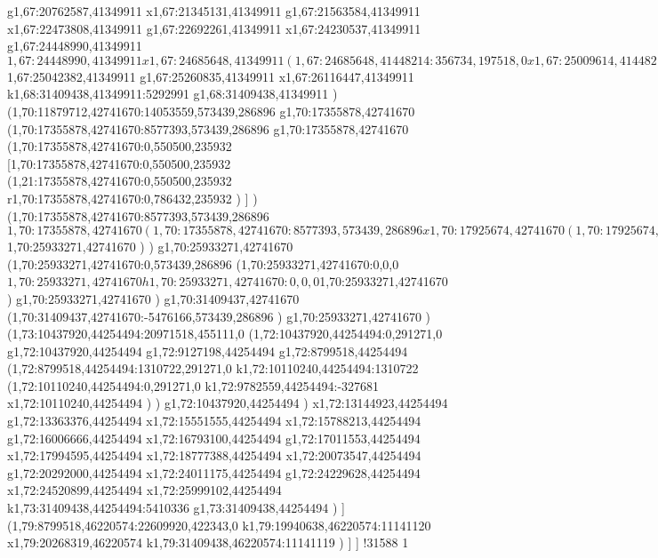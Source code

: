 {g1,67:20762587,41349911
x1,67:21345131,41349911
g1,67:21563584,41349911
x1,67:22473808,41349911
g1,67:22692261,41349911
x1,67:24230537,41349911
g1,67:24448990,41349911
$1,67:24448990,41349911
x1,67:24685648,41349911
(1,67:24685648,41448214:356734,197518,0
x1,67:25009614,41448214
)
$1,67:25042382,41349911
g1,67:25260835,41349911
x1,67:26116447,41349911
k1,68:31409438,41349911:5292991
g1,68:31409438,41349911
)
(1,70:11879712,42741670:14053559,573439,286896
g1,70:17355878,42741670
(1,70:17355878,42741670:8577393,573439,286896
g1,70:17355878,42741670
(1,70:17355878,42741670:0,550500,235932
[1,70:17355878,42741670:0,550500,235932
(1,21:17355878,42741670:0,550500,235932
r1,70:17355878,42741670:0,786432,235932
)
]
)
(1,70:17355878,42741670:8577393,573439,286896
$1,70:17355878,42741670
(1,70:17355878,42741670:8577393,573439,286896
x1,70:17925674,42741670
(1,70:17925674,42471077:497819,197518,0
x1,70:18390725,42471077
)
x1,70:19169877,42741670
g1,70:19351917,42741670
x1,70:20043688,42741670
g1,70:20225728,42741670
x1,70:20795524,42741670
[1,70:20795524,42939365:665910,771134,89201
(1,70:20795524,42450400:665910,282169,65536
x1,70:20993498,42450400
(1,70:20993498,42515936:435168,141084,0
x1,70:21395898,42515936
)
)
(1,70:20795524,42939365:498803,318577,89201
x1,70:21261559,42939365
)
]
x1,70:22207818,42741670
g1,70:22389858,42741670
x1,70:22899584,42741670
g1,70:23081624,42741670
x1,70:24142941,42741670
g1,70:24288573,42741670
x1,70:24798299,42741670
g1,70:24943931,42741670
x1,70:25180589,42741670
(1,70:25180589,42839973:497819,197518,0
x1,70:25645640,42839973
)
x1,70:25933271,42741670
)
$1,70:25933271,42741670
)
)
g1,70:25933271,42741670
(1,70:25933271,42741670:0,573439,286896
(1,70:25933271,42741670:0,0,0
$1,70:25933271,42741670
h1,70:25933271,42741670:0,0,0
$1,70:25933271,42741670
)
g1,70:25933271,42741670
)
g1,70:31409437,42741670
(1,70:31409437,42741670:-5476166,573439,286896
)
g1,70:25933271,42741670
)
(1,73:10437920,44254494:20971518,455111,0
(1,72:10437920,44254494:0,291271,0
g1,72:10437920,44254494
g1,72:9127198,44254494
g1,72:8799518,44254494
(1,72:8799518,44254494:1310722,291271,0
k1,72:10110240,44254494:1310722
(1,72:10110240,44254494:0,291271,0
k1,72:9782559,44254494:-327681
x1,72:10110240,44254494
)
)
g1,72:10437920,44254494
)
x1,72:13144923,44254494
g1,72:13363376,44254494
x1,72:15551555,44254494
x1,72:15788213,44254494
g1,72:16006666,44254494
x1,72:16793100,44254494
g1,72:17011553,44254494
x1,72:17994595,44254494
x1,72:18777388,44254494
x1,72:20073547,44254494
g1,72:20292000,44254494
x1,72:24011175,44254494
g1,72:24229628,44254494
x1,72:24520899,44254494
x1,72:25999102,44254494
k1,73:31409438,44254494:5410336
g1,73:31409438,44254494
)
]
(1,79:8799518,46220574:22609920,422343,0
k1,79:19940638,46220574:11141120
x1,79:20268319,46220574
k1,79:31409438,46220574:11141119
)
]
]
!31588
}1

